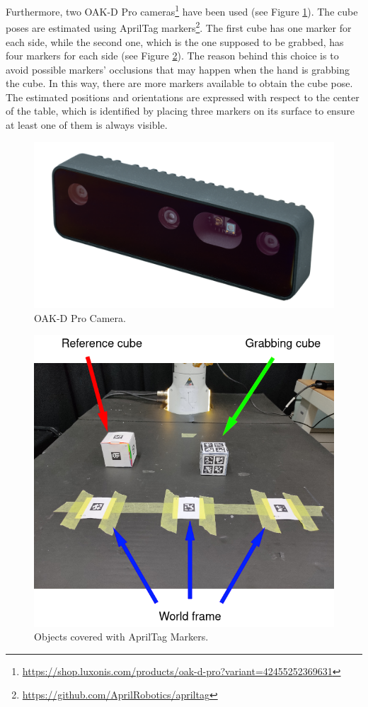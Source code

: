 \documentclass[a4paper]{article}
\begin{document}
Furthermore, two OAK-D Pro cameras\footnote{\url{https://shop.luxonis.com/products/oak-d-pro?variant=42455252369631}} have been used (see Figure \ref{camera}). The cube poses are estimated using AprilTag markers\footnote{\url{https://github.com/AprilRobotics/apriltag}}. The first cube has one marker for each side, while the second one, which is the one supposed to be grabbed, has four markers for each side (see Figure \ref{markers}). The reason behind this choice is to avoid possible markers' occlusions that may happen when the hand is grabbing the cube. In this way, there are more markers available to obtain the cube pose. 
The estimated positions and orientations are expressed with respect to the center of the table, which is identified by placing three markers on its surface to ensure at least one of them is always visible.

\begin{figure}[!hb]
    \centering
    \includegraphics[scale=0.2]{images/oak-d-pro1.png}
    \caption{OAK-D Pro Camera.}
    \label{camera}
\end{figure}

\begin{figure}[!hb]
    \centering
    \includegraphics[scale=0.75]{images/markers (1).png}
    \caption{Objects covered with AprilTag Markers.}
    \label{markers}
\end{figure}
\end{document}
